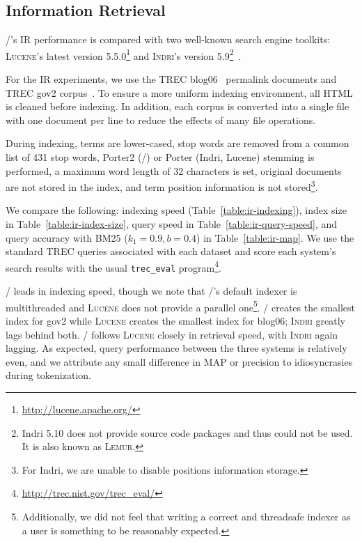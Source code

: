 \subsection{Information Retrieval}

\meta/'s IR performance is compared with two well-known search engine toolkits:
\textsc{Lucene}'s latest version 5.5.0\footnote{\url{http://lucene.apache.org/}} and
\textsc{Indri}'s version 5.9\footnote{Indri 5.10 does not provide source
    code packages and thus could not be used. It is also known as
\textsc{Lemur}.}~\cite{lemur}.

For the IR experiments, we use the TREC blog06~\cite{blog06} permalink documents
and TREC gov2 corpus~\cite{gov2}. To ensure a more uniform indexing environment,
all HTML is cleaned before indexing. In addition, each corpus is converted into
a single file with one document per line to reduce the effects of many file
operations.

During indexing, terms are lower-cased, stop words are removed from a common
list of 431 stop words, Porter2 (\meta/) or Porter (Indri, Lucene) stemming is
performed, a maximum word length of 32 characters is set, original documents are
not stored in the index, and term position information is not
stored\footnote{For Indri, we are unable to disable positions information
storage.}.

We compare the following: indexing speed (Table~\ref{table:ir-indexing}), index
size in Table~\ref{table:ir-index-size}, query speed in
Table~\ref{table:ir-query-speed}, and query accuracy with BM25 ($k_1=0.9,
b=0.4$) in Table~\ref{table:ir-map}. We use the standard TREC queries associated
with each dataset and score each system's search results with the usual
\texttt{trec\_eval} program\footnote{\url{http://trec.nist.gov/trec_eval/}}.

\meta/ leads in indexing speed, though we note that \meta/'s default
indexer is multithreaded and \textsc{Lucene} does not provide a parallel
one\footnote{Additionally, we did not feel that writing a correct and threadsafe
indexer as a user is something to be reasonably expected.}. \meta/ creates the
smallest index for gov2 while \textsc{Lucene} creates the smallest index for
blog06; \textsc{Indri} greatly lags behind both. \meta/ follows \textsc{Lucene}
closely in retrieval speed, with \textsc{Indri} again lagging. As expected,
query performance between the three systems is relatively even, and we attribute
any small difference in MAP or precision to idiosyncrasies during tokenization.

